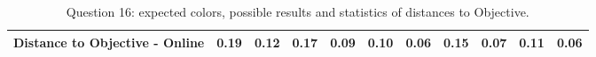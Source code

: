 \begin{table}[H]
{\begin{tabular}{lccccccccccccc}
    \multicolumn{4}{l}{Distance to Objective - Online}                                                                                               & \multicolumn{1}{|c}{0.19}        & \multicolumn{1}{c|}{0.12}    & \multicolumn{1}{|c}{0.17}        & \multicolumn{1}{c|}{0.09}    & \multicolumn{1}{|c}{\textbf{0.10}}       & \multicolumn{1}{c|}{0.06}    & \multicolumn{1}{|c}{0.15}        & \multicolumn{1}{c|}{0.07}    & \multicolumn{1}{|c}{0.11}       & \multicolumn{1}{c|}{0.06}    \\ \hline
    \end{tabular}}
  \caption[Question 16, with expected Results.]{Question 16: expected colors, possible results and statistics of distances to Objective.}
  \vspace{-5pt}
  \label{table:lab_q16_expected}
\end{table}
%
